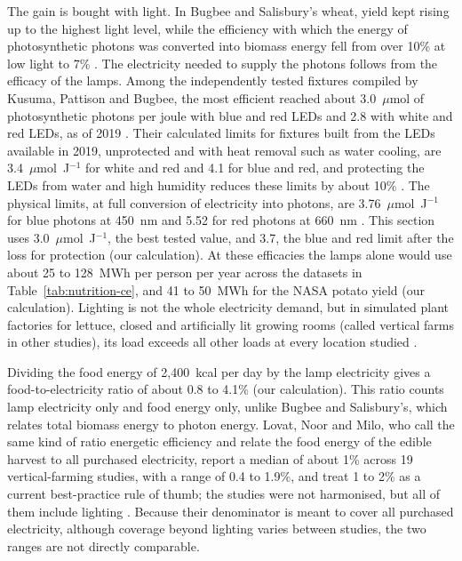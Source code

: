 The gain is bought with light. In Bugbee and Salisbury's wheat, yield kept rising up to the highest light level, while the efficiency with which the energy of photosynthetic photons was converted into biomass energy fell from over 10\% at low light to 7\% \cite[Abstract, p.~869; Fig.~2B, p.~873]{bugbee1988limits}. The electricity needed to supply the photons follows from the efficacy of the lamps. Among the independently tested fixtures compiled by Kusuma, Pattison and Bugbee, the most efficient reached about 3.0~$\mu$mol of photosynthetic photons per joule with blue and red LEDs and 2.8 with white and red LEDs, as of 2019 \cite[Table~2, p.~7]{kusuma2020led}.%
 Their calculated limits for fixtures built from the LEDs available in 2019, unprotected and with heat removal such as water cooling, are 3.4~$\mu$mol~J$^{-1}$ for white and red and 4.1 for blue and red, and protecting the LEDs from water and high humidity reduces these limits by about 10\% \cite[Abstract, p.~1; p.~6]{kusuma2020led}. The physical limits, at full conversion of electricity into photons, are 3.76~$\mu$mol~J$^{-1}$ for blue photons at 450~nm and 5.52 for red photons at 660~nm \cite[Fig.~2, p.~3]{kusuma2020led}. This section uses 3.0~$\mu$mol~J$^{-1}$, the best tested value, and 3.7, the blue and red limit after the loss for protection (our calculation). At these efficacies the lamps alone would use about 25 to 128~MWh per person per year across the datasets in Table~\ref{tab:nutrition-ce}, and 41 to 50~MWh for the NASA potato yield (our calculation). Lighting is not the whole electricity demand, but in simulated plant factories for lettuce, closed and artificially lit growing rooms (called vertical farms in other studies), its load exceeds all other loads at every location studied \cite[Section~4.1 and Fig.~4, p.~37; Fig.~5, p.~38]{graamans2018plant}.

Dividing the food energy of 2{,}400~kcal per day by the lamp electricity gives a food-to-electricity ratio of about 0.8 to 4.1\% (our calculation). This ratio counts lamp electricity only and food energy only, unlike Bugbee and Salisbury's, which relates total biomass energy to photon energy. Lovat, Noor and Milo, who call the same kind of ratio energetic efficiency and relate the food energy of the edible harvest to all purchased electricity, report a median of about 1\% across 19 vertical-farming studies, with a range of 0.4 to 1.9\%, and treat 1 to 2\% as a current best-practice rule of thumb; the studies were not harmonised, but all of them include lighting \cite[p.~2]{lovat2025vf}. Because their denominator is meant to cover all purchased electricity, although coverage beyond lighting varies between studies, the two ranges are not directly comparable.

